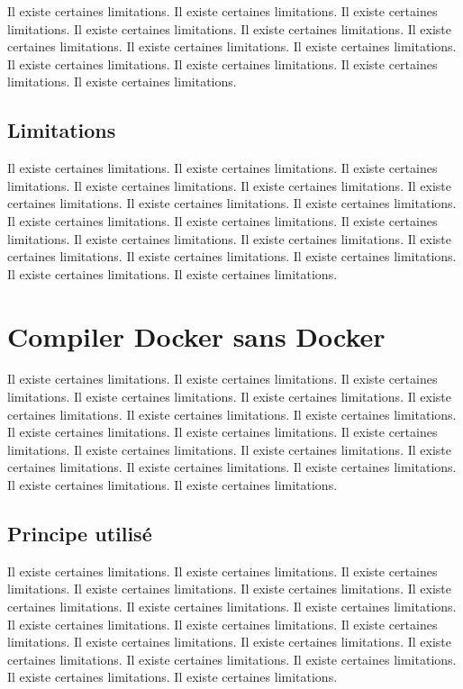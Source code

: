 \documentclass[11pt,a4paper,oneside]{report}
\begin{document}
Il existe certaines limitations.
Il existe certaines limitations.
Il existe certaines limitations.
Il existe certaines limitations.
Il existe certaines limitations.
Il existe certaines limitations.
Il existe certaines limitations.
Il existe certaines limitations.
Il existe certaines limitations.
Il existe certaines limitations.
Il existe certaines limitations.
Il existe certaines limitations.
\subsection{Limitations}

Il existe certaines limitations.
Il existe certaines limitations.
Il existe certaines limitations.
Il existe certaines limitations.
Il existe certaines limitations.
Il existe certaines limitations.
Il existe certaines limitations.
Il existe certaines limitations.
Il existe certaines limitations.
Il existe certaines limitations.
Il existe certaines limitations.
Il existe certaines limitations.
Il existe certaines limitations.
Il existe certaines limitations.
Il existe certaines limitations.
Il existe certaines limitations.
Il existe certaines limitations.
Il existe certaines limitations.


\section{Compiler Docker sans Docker}

Il existe certaines limitations.
Il existe certaines limitations.
Il existe certaines limitations.
Il existe certaines limitations.
Il existe certaines limitations.
Il existe certaines limitations.
Il existe certaines limitations.
Il existe certaines limitations.
Il existe certaines limitations.
Il existe certaines limitations.
Il existe certaines limitations.
Il existe certaines limitations.
Il existe certaines limitations.
Il existe certaines limitations.
Il existe certaines limitations.
Il existe certaines limitations.
Il existe certaines limitations.
Il existe certaines limitations.
\subsection{Principe utilisé}

Il existe certaines limitations.
Il existe certaines limitations.
Il existe certaines limitations.
Il existe certaines limitations.
Il existe certaines limitations.
Il existe certaines limitations.
Il existe certaines limitations.
Il existe certaines limitations.
Il existe certaines limitations.
Il existe certaines limitations.
Il existe certaines limitations.
Il existe certaines limitations.
Il existe certaines limitations.
Il existe certaines limitations.
Il existe certaines limitations.
Il existe certaines limitations.
Il existe certaines limitations.
Il existe certaines limitations.
\end{document}
